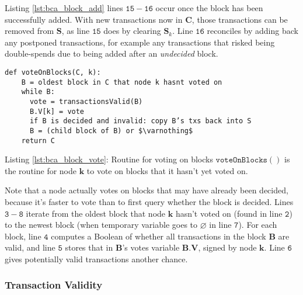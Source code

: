 Listing \ref{lst:bca_block_add} lines $\mathtt{15-16}$ occur once the block has been successfully added. With new transactions now in $\mathbf{C}$, those transactions can be removed from $\mathbf{S}$, as line $\mathtt{15}$ does by clearing $\mathbf{S}_k$.
Line $\mathtt{16}$ reconciles by adding back any postponed transactions, for example any transactions that risked being double-spends due to being added after an \textsf{\textit{undecided}} block.

\begin{minipage}{\linewidth}
  \begin{lstlisting}[caption={Routine for voting on blocks.}, label={lst:bca_block_vote}, style=python, mathescape=true]
  def voteOnBlocks(C, k): 
    B = oldest block in C that node k hasnt voted on
    while B: 
      vote = transactionsValid(B)
      B.V[k] = vote
      if B is decided and invalid: copy B’s txs back into S 
      B = (child block of B) or $\varnothing$
    return C
  \end{lstlisting}
\end{minipage}

\noindent Listing \ref{lst:bca_block_vote}: Routine for voting on blocks $\mathtt{voteOnBlocks()}$ is the routine for node $\mathbf{k}$ to vote on blocks that it hasn’t yet voted on.

Note that a node actually votes on blocks that may have already been decided, because it’s faster to vote than to first query whether the block is decided.
Lines $\mathtt{3-8}$ iterate from the oldest block that node $\mathbf{k}$ hasn’t voted on (found in line $\mathtt{2}$) to the newest block (when temporary variable goes to $\varnothing$ in line $\mathtt{7}$).
For each block, line $\mathtt{4}$ computes a Boolean of whether all transactions in the block $\mathbf{B}$ are valid, and line $\mathtt{5}$ stores that in $\mathbf{B}$’s votes variable $\mathbf{B.V}$, signed by node $\mathbf{k}$.
Line $\mathtt{6}$ gives potentially valid transactions another chance.

\subsubsection{Transaction Validity}

